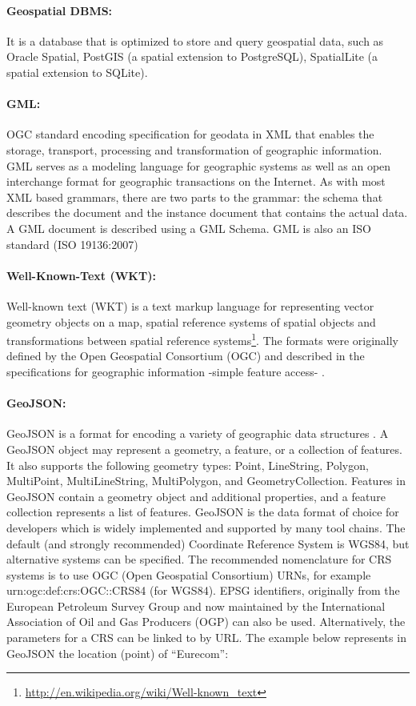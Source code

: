  \paragraph{Geospatial DBMS:}
 It is a database that is optimized to store and query geospatial data, such as Oracle Spatial, PostGIS (a spatial extension to PostgreSQL), SpatialLite (a spatial extension to SQLite). 
 
 \paragraph{GML:}
 OGC standard encoding specification for geodata in XML that enables the storage, transport, processing and transformation of geographic information. GML serves as a modeling language for geographic systems as well as an open interchange format for geographic transactions on the Internet. As with most XML based grammars, there are two parts to the grammar: the schema that describes the document and the instance document that contains the actual data. A GML document is described using a GML Schema. GML is also an ISO standard (ISO 19136:2007) 
 
 \paragraph{Well-Known-Text (WKT):}
 Well-known text (WKT) is a text markup language for representing vector geometry objects on a map, spatial reference systems of spatial objects and transformations between spatial reference systems\footnote{\url{http://en.wikipedia.org/wiki/Well-known_text}}. The formats were originally defined by the Open Geospatial Consortium (OGC) and described in the specifications for geographic information -simple feature access- \cite{opengis2011}. 
 
 \paragraph{GeoJSON:}
 
GeoJSON is a format for encoding a variety of geographic data structures \cite{geojson}. A GeoJSON object may represent a geometry, a feature, or a collection of features. It also supports the following geometry types: Point, LineString, Polygon, MultiPoint, MultiLineString, MultiPolygon, and GeometryCollection. Features in GeoJSON contain a geometry object and additional properties, and a feature collection represents a list of features. GeoJSON is the data format of choice for developers which is widely implemented and supported by many tool chains.
The default (and strongly recommended) Coordinate Reference System is WGS84, but alternative systems can be specified. The recommended nomenclature for CRS systems is to use OGC (Open Geospatial Consortium) URNs, for example urn:ogc:def:crs:OGC::CRS84 (for WGS84). EPSG identifiers, originally from the European Petroleum Survey Group and now maintained by the International Association of Oil and Gas Producers (OGP) can also be used. Alternatively, the parameters for a CRS can be linked to by URL. 
The example below represents in GeoJSON the location (point) of ``Eurecom'':

